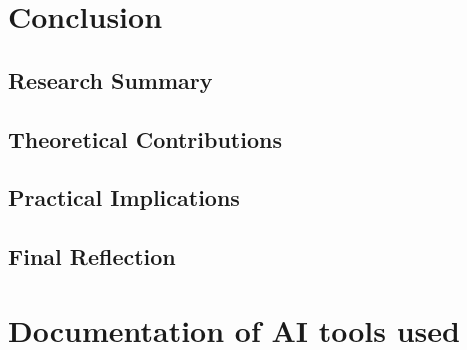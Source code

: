 \documentclass[11pt,a4paper]{article}
\begin{document}
\section{Conclusion}\label{sec:conclusion}

\subsection{Research Summary}\label{subsec:research-summary}

\blindtext

\subsection{Theoretical Contributions}\label{subsec:theoretical-contributions}

\blindtext

\subsection{Practical Implications}\label{subsec:practical-implications}

\blindtext

\subsection{Final Reflection}\label{subsec:final-reflection}

\blindtext

\newpage
\printbibliography[heading=bibintoc,title={References}]

\newpage
\section*{Documentation of AI tools used}\label{sec:ai-tools}
\end{document}
